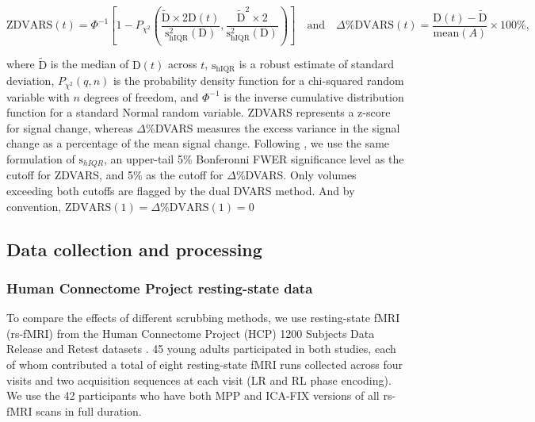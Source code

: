 \documentclass{article}
\begin{document}
$$
\textrm{ZDVARS}(t) = \Phi^{-1} \left[ 1-P_{\chi^2}\left(\frac{\widetilde{\text{D}}\times2\text{D}(t)}{\text{s}_{\text{hIQR}}^2(\text{D})},\frac{\widetilde{\text{D}}^2\times2}{\text{s}_{\text{hIQR}}^2(\text{D})}\right) \right]
\quad\text{and}\quad
\Delta \%\textrm{DVARS}(t) = \frac{\text{D}(t) - \widetilde{\text{D}}}{\text{mean}(A)} \times 100\%,
$$

where $\widetilde{\text{D}}$ is the median of $\text{D}(t)$ across $t$, $\text{s}_{\text{hIQR}}$ is a robust estimate of  standard deviation, $P_{\chi^2}(q,n)$ is the probability density function for a chi-squared random variable with $n$ degrees of freedom, and $\Phi^{-1}$ is the inverse cumulative distribution function for a standard Normal random variable. %
ZDVARS represents a z-score for signal change, whereas $\Delta$\%DVARS measures the excess variance in the signal change as a percentage of the mean signal change. Following \cite{afyouniInsightInferenceDVARS2018}, we use the same formulation of $\text{s}_{hIQR}$, an upper-tail 5\% Bonferonni FWER significance level as the cutoff for ZDVARS, and 5\% as the cutoff for $\Delta$\%DVARS. Only volumes exceeding both cutoffs are flagged by the dual DVARS method. And by convention, $\text{ZDVARS}(1) = \Delta \%\textrm{DVARS}(1) = 0$

\subsection{Data collection and processing}\label{sec:data}

\subsubsection{Human Connectome Project resting-state data}

To compare the effects of different scrubbing methods, we use resting-state fMRI (rs-fMRI) from the Human Connectome Project (HCP) 1200 Subjects Data Release and Retest datasets \citep{vanessenWUMinnHumanConnectome2013}. 45 young adults participated in both studies, each of whom contributed a total of eight resting-state fMRI runs collected across four visits and two acquisition sequences at each visit (LR and RL phase encoding). We use the 42 participants who have both MPP and ICA-FIX versions of all rs-fMRI scans in full duration.
\end{document}
